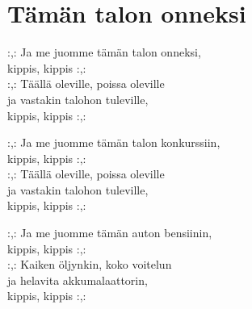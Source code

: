 \section{Tämän talon onneksi}
\vspace*{-0.3cm}
:,: Ja me juomme tämän talon onneksi,\\
kippis, kippis :,:\\
:,: Täällä oleville, poissa oleville\\
ja vastakin talohon tuleville,\\
kippis, kippis :,:


:,: Ja me juomme tämän talon konkurssiin,\\
kippis, kippis :,:\\
:,: Täällä oleville, poissa oleville\\
ja vastakin talohon tuleville,\\
kippis, kippis :,:


:,: Ja me juomme tämän auton bensiinin,\\
kippis, kippis :,:\\
:,: Kaiken öljynkin, koko voitelun\\
ja helavita akkumalaattorin,\\
kippis, kippis :,: